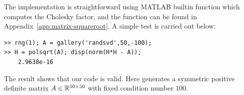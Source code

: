 \documentclass[12pt]{article}
\begin{document}
The implementation is straightforward using MATLAB builtin function  which computes the Cholesky factor, and the function  can be found in Appendix~\ref{app:matrix-squareroot}. A simple test is carried out below:
\begin{lstlisting}
>> rng(1); A = gallery('randsvd',50,-100); 
>> H = polsqrt(A); disp(norm(H*H - A));
    2.9638e-16
\end{lstlisting}
The result shows that our code is valid. Here  generates a symmetric positive definite matrix $A\in\mathbb{R}^{50\times 50}$ with fixed condition number $100$.


\newpage 


\newpage 

\end{document}

